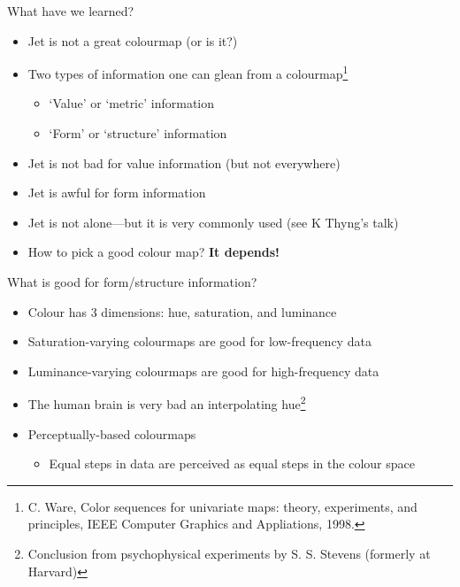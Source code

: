 \documentclass[10pt,presentation,compress]{beamer}
\begin{document}
\begin{frame}{What have we learned?}
  \begin{itemize}
    \item Jet is not a great colourmap (or is it?)
    \item Two types of information one can glean from a colourmap\footnote{C.
      Ware, Color sequences for univariate maps: theory, experiments, and
      principles, IEEE Computer Graphics and Appliations, 1998.}
      \begin{itemize}
        \item `Value' or `metric' information
        \item `Form' or `structure' information
      \end{itemize}
    \item Jet is not bad for value information (but not everywhere)
    \item Jet is awful for form information
    \item Jet is not alone---but it is very commonly used (see K Thyng's talk)
    \item How to pick a good colour map?  \textbf{It depends!}
  \end{itemize}
\end{frame}

\begin{frame}{What is good for form/structure information?}
  \begin{itemize}
    \item Colour has 3 dimensions: hue, saturation, and luminance
    \item Saturation-varying colourmaps are good for low-frequency data
    \item Luminance-varying colourmaps are good for high-frequency data
    \item The human brain is very bad an interpolating hue\footnote{Conclusion
      from psychophysical experiments by S. S. Stevens (formerly at Harvard)}
    \item Perceptually-based colourmaps
      \begin{itemize}
        \item Equal steps in data are perceived as equal steps in the colour
          space
      \end{itemize}
  \end{itemize}
\end{frame}
\end{document}
